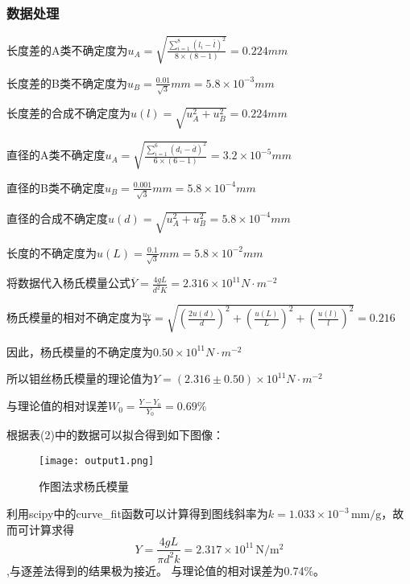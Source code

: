 \documentclass[UTF-8,twoside,cs4size]{ctexart}
\begin{document}
\subsubsection{数据处理}
长度差的A类不确定度为${u_A} = \sqrt {\frac{{\sum\limits_{i = 1}^8 {{{\left( {l_i - \overline l } \right)}^2}} }}{{8 \times \left( {8 - 1} \right)}}}  = 0.224mm$\par
    长度差的B类不确定度为$ {u_B} = \frac{{0.01}}{{\sqrt 3 }}mm= 5.8 \times {10^{ - 3}}mm$ \par
    长度差的合成不确定度为$u\left( l \right) = \sqrt {u_A^2 + u_B^2}  = 0.224mm$\par
    直径的A类不确定度${u_A} = \sqrt {\frac{{\sum\limits_{i = 1}^6 {{{\left( {{d_i} - \overline d } \right)}^2}} }}{{6 \times \left( {6 - 1} \right)}}}  = 3.2 \times {10^{ - 5}}mm$\par
    直径的B类不确定度${u_B} = \frac{{0.001}}{{\sqrt 3 }}mm = 5.8 \times {10^{ - 4}}mm$\par
    直径的合成不确定度$u\left( d \right) = \sqrt {u_A^2 + u_B^2}  = 5.8 \times {10^{ - 4}}mm$\par
    长度的不确定度为$u\left( L \right) = \frac{{0.1}}{{\sqrt 3 }}mm = 5.8 \times {10^{ - 2}}mm$\par

    将数据代入杨氏模量公式$\overline Y  = \frac{4gL}{{{d^2}K}} = 2.316 \times {10^{11}}N \cdot {m^{ - 2}}$\par

    杨氏模量的相对不确定度为$\frac{{{u_Y}}}{Y} = \sqrt {{{\left( {\frac{{2u\left( d \right)}}{d}} \right)}^2} + {{\left( {\frac{{u\left( L \right)}}{L}} \right)}^2} + {{\left( {\frac{{u\left( l \right)}}{l}} \right)}^2} }  = 0.216$\par
    因此，杨氏模量的不确定度为$ 0.50 \times {10^{ 11}}N \cdot {m^{ - 2}}$\par
    所以钼丝杨氏模量的理论值为$Y = \left( {2.316 \pm 0.50} \right) \times {10^{ 11}}N \cdot {m^{ - 2}}$\par
    与理论值的相对误差${W_0} = \frac{{Y - {Y_0}}}{{{Y_0}}} = 0.69\% $
    
    根据表(2)中的数据可以拟合得到如下图像：
    \begin{figure}[!h]
        \centering
        \texttt{[image: output1.png]}
        \caption{作图法求杨氏模量}
    \end{figure}
    
    利用scipy中的curve_fit函数可以计算得到图线斜率为$ k=1.033\times10^{-3}\,\mathrm{mm/g} $，故而可计算求得
	\[Y=\frac{4gL}{\pi d^2k}=2.317\times10^{11}\,\mathrm{N/m^2}\],与逐差法得到的结果极为接近。
	与理论值的相对误差为0.74\%。
\end{document}
